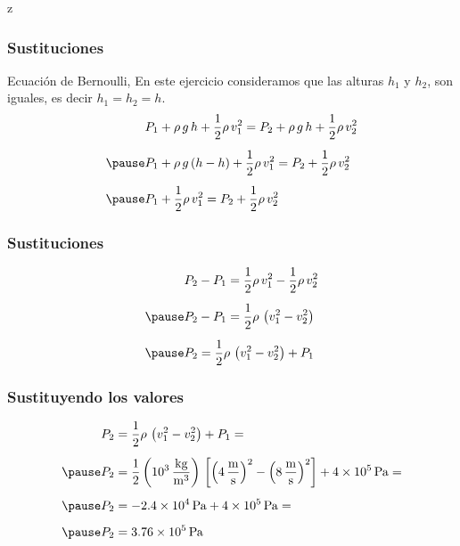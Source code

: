 z\documentclass[14pt]{beamer}
\begin{document}
\begin{frame}
\frametitle{Sustituciones}
Ecuación de Bernoulli, \pause En este ejercicio consideramos que las alturas $h_{1}$ y $h_{2}$, son iguales, es decir $h_{1} = h_{2} = h$.
\pause
\begin{eqnarray*}
\begin{aligned}
&P_{1} + \rho \, g \, h + \dfrac{1}{2} \rho \, v_{1}^{2} = P_{2} + \rho \, g \, h + \dfrac{1}{2} \rho \, v_{2}^{2} \\[0.5em] \pause
&P_{1} + \rho \, g \, (h - h) + \dfrac{1}{2} \rho \, v_{1}^{2} = P_{2} + \dfrac{1}{2} \rho \, v_{2}^{2} \\[0.5em] \pause
&P_{1} + \dfrac{1}{2} \rho \, v_{1}^{2} = P_{2} + \dfrac{1}{2} \rho \, v_{2}^{2}
\end{aligned}
\end{eqnarray*}
\end{frame}
\begin{frame}
\frametitle{Sustituciones}
\begin{eqnarray*}
\begin{aligned}    
&P_{2} - P_{1} = \dfrac{1}{2} \rho \, v_{1}^{2} - \dfrac{1}{2} \rho \, v_{2}^{2} \\[0.5em] \pause
&P_{2} - P_{1} = \dfrac{1}{2} \rho \, \left( v_{1}^{2} - v_{2}^{2} \right) \\[0.5em] \pause
&P_{2} = \dfrac{1}{2} \rho \, \left( v_{1}^{2} - v_{2}^{2} \right) + P_{1}
\end{aligned}
\end{eqnarray*}
\end{frame}
\begin{frame}
\frametitle{Sustituyendo los valores}
\begin{eqnarray*}
\begin{aligned}
P_{2} &= \dfrac{1}{2} \rho \, \left( v_{1}^{2} - v_{2}^{2} \right) + P_{1} = \\[0.5em] \pause
P_{2} &= \dfrac{1}{2} \left( \SI[per-mode=fraction]{d3}{\kilo\gram\per\cubic\meter} \right) \, \left[ \left( \SI[per-mode=fraction]{4}{\meter\per\second} \right)^{2} - \left( \SI[per-mode=fraction]{8}{\meter\per\second} \right)^{2} \right] + \SI{4d5}{\pascal} =  \\[0.5em] \pause
P_{2} &= - \SI{2.4d4}{\pascal} + \SI{4d5}{\pascal} =  \\[0.5em] \pause
P_{2} &= \SI{3.76d5}{\pascal}
\end{aligned}
\end{eqnarray*}
\end{frame}
\end{document}
